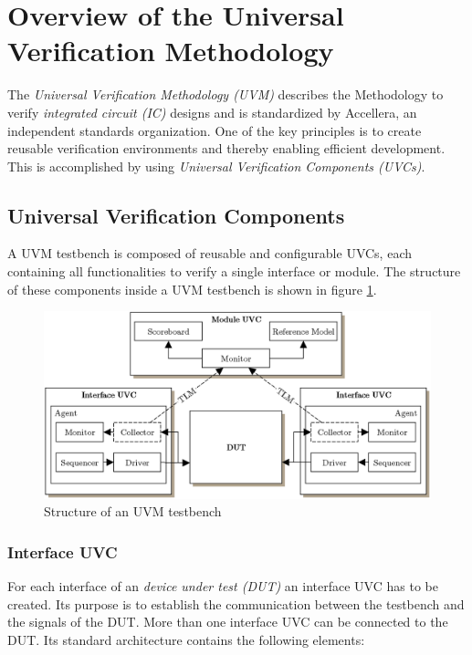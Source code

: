 \section{Overview of the Universal Verification Methodology}\label{uvm}

The \emph{Universal Verification Methodology (UVM)} describes the Methodology to
verify \emph{integrated circuit (IC)} designs and is standardized by Accellera,
an independent standards organization. One of the key principles is to create
reusable verification environments and thereby enabling efficient development.
This is accomplished by using \emph{Universal Verification Components (UVCs)}.

\subsection{Universal Verification Components}\label{uvc}

A UVM testbench is composed of reusable and configurable UVCs, each
containing all functionalities to verify a single interface or module. The
structure of these components inside a UVM testbench is shown in figure
\ref{fig:UVM_testbench}.

\begin{figure}[htb]
 \centering
 \includegraphics[scale=0.3]{abb/UVM_testbench}
 \caption{Structure of an UVM testbench}
\label{fig:UVM_testbench}
\end{figure}

\subsubsection{Interface UVC}\label{interface_uvc}

For each interface of an \emph{device under test (DUT)} an interface UVC has
to be created. Its purpose is to establish the communication between
the testbench and the signals of the DUT. More than one interface UVC can be
connected to the DUT. Its standard architecture contains the following elements:

